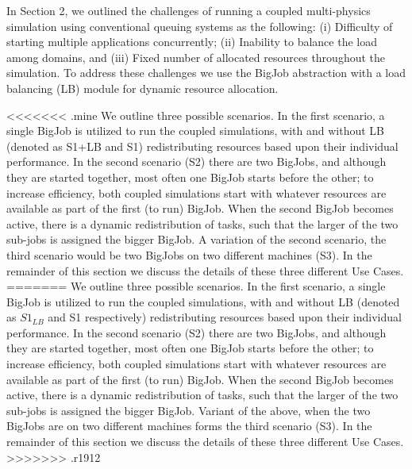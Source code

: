 \documentclass[conference,final]{IEEEtran}
\newcommand{\skonote}[1]{ {\textcolor{blue} { ***Jeff: #1 }}}
\newcommand{\skonote}[1]{}
\begin{document}
In Section 2, we outlined the challenges of running a coupled
multi-physics simulation using conventional queuing systems as the following: (i)
Difficulty of starting multiple applications concurrently; (ii)
Inability to balance the load among domains, and (iii) Fixed number of
allocated resources throughout the simulation. To address these
challenges we use the BigJob abstraction with a load balancing (LB) module
for dynamic resource allocation.



<<<<<<< .mine
We outline three possible scenarios. In the first
scenario, a single BigJob is utilized to run the coupled simulations, with and without LB (denoted as S1+LB and S1) redistributing resources based upon
their individual performance.  In the second scenario (S2) there are
two BigJobs, and although they are started together, most often one
BigJob starts before the other; to increase efficiency, both coupled
simulations start with whatever resources are available as part of the
first (to run) BigJob. When the second BigJob becomes active, there is
a dynamic redistribution of tasks, such that the larger of the two
sub-jobs is assigned the bigger BigJob. A variation of the second scenario, the third scenario would be two BigJobs on two different machines (S3). In the remainder of this section we discuss the details of these
three different Use Cases.
=======
We outline three possible scenarios. In the first scenario, a single
BigJob is utilized to run the coupled simulations, with and without LB
(denoted as $S1_{LB}$ and S1 respectively) redistributing resources
based upon their individual performance.  In the second scenario (S2)
there are two BigJobs, and although they are started together, most
often one BigJob starts before the other; to increase efficiency, both
coupled simulations start with whatever resources are available as
part of the first (to run) BigJob. When the second BigJob becomes
active, there is a dynamic redistribution of tasks, such that the
larger of the two sub-jobs is assigned the bigger BigJob. Variant of
the above, when the two BigJobs are on two different machines forms
the third scenario (S3). In the remainder of this section we discuss
the details of these three different Use Cases. 
>>>>>>> .r1912
\end{document}
